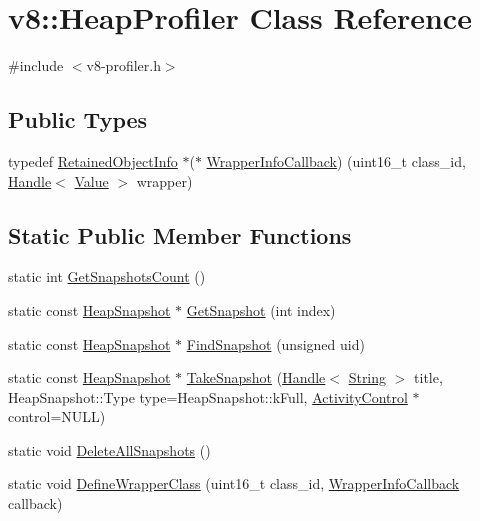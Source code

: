 \hypertarget{classv8_1_1_heap_profiler}{}\section{v8\+:\+:Heap\+Profiler Class Reference}
\label{classv8_1_1_heap_profiler}


{\ttfamily \#include $<$v8-\/profiler.\+h$>$}

\subsection*{Public Types}
\begin{DoxyCompactItemize}
\item 
typedef \hyperlink{classv8_1_1_retained_object_info}{Retained\+Object\+Info} $\ast$($\ast$ \hyperlink{classv8_1_1_heap_profiler_a696d8d6590879eeb5a4ad2814eafb599}{Wrapper\+Info\+Callback}) (uint16\+\_\+t class\+\_\+id, \hyperlink{classv8_1_1_handle}{Handle}$<$ \hyperlink{classv8_1_1_value}{Value} $>$ wrapper)
\end{DoxyCompactItemize}
\subsection*{Static Public Member Functions}
\begin{DoxyCompactItemize}
\item 
static int \hyperlink{classv8_1_1_heap_profiler_a739a665268bba6e640890464ccb60d26}{Get\+Snapshots\+Count} ()
\item 
static const \hyperlink{classv8_1_1_heap_snapshot}{Heap\+Snapshot} $\ast$ \hyperlink{classv8_1_1_heap_profiler_ad547f406908880cc7dc0453fe83cc216}{Get\+Snapshot} (int index)
\item 
static const \hyperlink{classv8_1_1_heap_snapshot}{Heap\+Snapshot} $\ast$ \hyperlink{classv8_1_1_heap_profiler_a1f77545176060f21239bd1a78e3967a7}{Find\+Snapshot} (unsigned uid)
\item 
static const \hyperlink{classv8_1_1_heap_snapshot}{Heap\+Snapshot} $\ast$ \hyperlink{classv8_1_1_heap_profiler_a39e6df3b54335e183ca57edae1dc78e7}{Take\+Snapshot} (\hyperlink{classv8_1_1_handle}{Handle}$<$ \hyperlink{classv8_1_1_string}{String} $>$ title, Heap\+Snapshot\+::\+Type type=Heap\+Snapshot\+::k\+Full, \hyperlink{classv8_1_1_activity_control}{Activity\+Control} $\ast$control=N\+U\+L\+L)
\item 
static void \hyperlink{classv8_1_1_heap_profiler_af01cf79839c61b5cc6a92c422fd9875f}{Delete\+All\+Snapshots} ()
\item 
static void \hyperlink{classv8_1_1_heap_profiler_ae83d1fc891a24ecafdca44fca2dbe07a}{Define\+Wrapper\+Class} (uint16\+\_\+t class\+\_\+id, \hyperlink{classv8_1_1_heap_profiler_a696d8d6590879eeb5a4ad2814eafb599}{Wrapper\+Info\+Callback} callback)
\end{DoxyCompactItemize}
